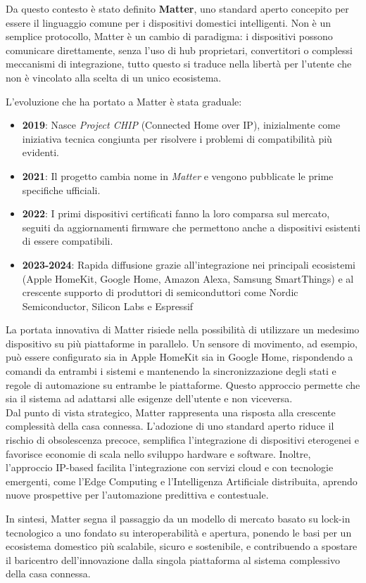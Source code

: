 Da questo contesto è stato definito \textbf{Matter}, uno standard aperto concepito per essere il linguaggio comune per i dispositivi domestici intelligenti. Non è un semplice protocollo, Matter è un cambio di paradigma: i dispositivi possono comunicare direttamente, senza l’uso di hub proprietari, convertitori o complessi meccanismi di integrazione, tutto questo si traduce nella libertà per l’utente che non è vincolato alla scelta di un unico ecosistema.

L’evoluzione che ha portato a Matter è stata graduale:

\begin{itemize}
    \item \textbf{2019}: Nasce \textit{Project CHIP} (Connected Home over IP), inizialmente come iniziativa tecnica congiunta per risolvere i problemi di compatibilità più evidenti.
    \item \textbf{2021}: Il progetto cambia nome in \textit{Matter} e vengono pubblicate le prime specifiche ufficiali.
    \item \textbf{2022}: I primi dispositivi certificati fanno la loro comparsa sul mercato, seguiti da aggiornamenti firmware che permettono anche a dispositivi esistenti di essere compatibili.
    \item \textbf{2023-2024}: Rapida diffusione grazie all’integrazione nei principali ecosistemi (Apple HomeKit, Google Home, Amazon Alexa, Samsung SmartThings) e al crescente supporto di produttori di semiconduttori come Nordic Semiconductor, Silicon Labs e Espressif
\end{itemize}

La portata innovativa di Matter risiede nella possibilità di utilizzare un medesimo dispositivo su più piattaforme in parallelo. Un sensore di movimento, ad esempio, può essere configurato sia in Apple HomeKit sia in Google Home, rispondendo a comandi da entrambi i sistemi e mantenendo la sincronizzazione degli stati e regole di automazione su entrambe le piattaforme. Questo approccio permette che sia il sistema ad adattarsi alle esigenze dell'utente e non viceversa.\\

Dal punto di vista strategico, Matter rappresenta una risposta alla crescente complessità della casa connessa. L’adozione di uno standard aperto riduce il rischio di obsolescenza precoce, semplifica l’integrazione di dispositivi eterogenei e favorisce economie di scala nello sviluppo hardware e software. Inoltre, l’approccio IP-based facilita l’integrazione con servizi cloud e con tecnologie emergenti, come l’Edge Computing e l’Intelligenza Artificiale distribuita, aprendo nuove prospettive per l’automazione predittiva e contestuale.

In sintesi, Matter segna il passaggio da un modello di mercato basato su lock-in tecnologico a uno fondato su interoperabilità e apertura, ponendo le basi per un ecosistema domestico più scalabile, sicuro e sostenibile, e contribuendo a spostare il baricentro dell’innovazione dalla singola piattaforma al sistema complessivo della casa connessa.

